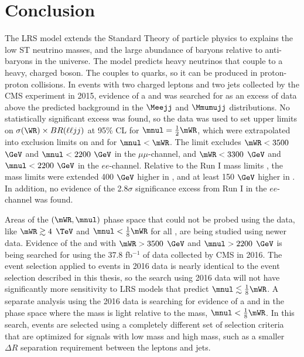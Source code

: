 \chapter{Conclusion}
\label{conclusion_chapter}
The LRS model extends the Standard Theory of particle physics to explains the low ST neutrino masses, and the large 
abundance of baryons relative to anti-baryons in the universe.  The model predicts heavy neutrinos \nul that couple to a heavy, 
charged \WR boson.  The \WR couples to quarks, so it can be produced in proton-proton collisions.  In events with two charged 
leptons and two jets collected by the CMS experiment in 2015, evidence of a \WR and \nul was searched for as an excess of data 
above the predicted background in the $\Meejj$ and $\Mmumujj$ distributions.  No statistically significant excess was found, so 
the data was used to set upper limits on $\sigma(\WR) \times BR(\ell\ell jj)$ at 95\% CL for $\mnul = \frac{1}{2}\mWR$, which 
were extrapolated into exclusion limits on \mWR and \mnul for $\mnul < \mWR$.  The limit excludes $\mWR < 3500$ 
$\GeV$ and $\mnul < 2200$ $\GeV$ in the $\mu\mu$-channel, and $\mWR < 3300$ $\GeV$ and $\mnul < 2200$ $\GeV$ in the $ee$-channel.  
Relative to the Run I mass limits \cite{cmsWRRunOneResults}, the mass limits were extended 400 $\GeV$ higher in \mWR, and at least 
150 $\GeV$ higher in \mnul.  In addition, no evidence of the 2.8$\sigma$ significance excess from Run I in the $ee$-channel was found.

Areas of the $(\mWR, \mnul)$ phase space that could not be probed using the data, like $\mWR \gtrsim 4$ $\TeV$ and $\mnul < 
\frac{1}{8}\mWR$ for all \mWR, are being studied using newer data.  Evidence of the \WR and \nul with $\mWR > 3500$ $\GeV$ and 
$\mnul > 2200$ $\GeV$ is being searched for using the 37.8 fb$^{-1}$ of data \cite{lumi} collected by CMS in 2016.  The event selection 
applied to events in 2016 data is nearly identical to the event selection described in this thesis, so the search using 2016 data will 
not have significantly more sensitivity to LRS models that predict $\mnul \lesssim \frac{1}{8}\mWR$.  A separate analysis using the 
2016 data is searching for evidence of a \WR and \nul in the phase space where the \nul mass is light relative to the \WR mass, 
$\mnul < \frac{1}{8}\mWR$.  In this search, events are selected using a completely different set of selection criteria that are optimized 
for signals with low \nul mass and high \WR mass, such as a smaller $\Delta R$ separation requirement between the leptons and jets.


